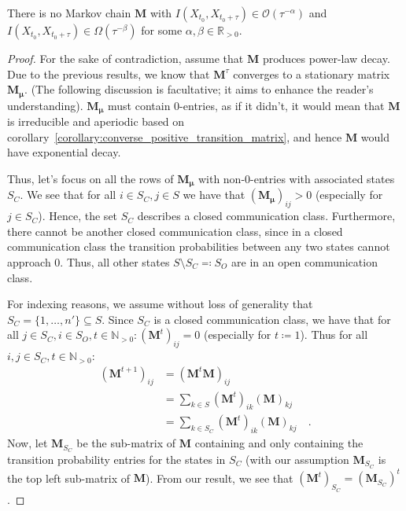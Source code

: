 \documentclass[../../main.tex]{subfiles}
\begin{document}
    \begin{theorem}
        There is no Markov chain $\bm{M}$ with $I(X_{t_0}, X_{t_0 + \tau}) \in \mathcal{O}(\tau^{-\alpha})$ and $I(X_{t_0}, X_{t_0 + \tau}) \in \Omega (\tau^{-\beta})$ for some $\alpha, \beta \in \mathbb{R}_{>0}$.
    \end{theorem}
    \vspace{-2.5em}
    \begin{proof}
        For the sake of contradiction, assume that $\bm{M}$ produces power-law decay. Due to the previous results, we know that $\bm{M}^\tau$ converges to a stationary matrix $\bm{M_\mu}$. (The following discussion is facultative; it aims to enhance the reader's understanding). $\bm{M_\mu}$ must contain 0-entries, as if it didn't, it would mean that $\bm{M}$ is irreducible and aperiodic based on corollary~\ref{corollary:converse_positive_transition_matrix}, and hence $\bm{M}$ would have exponential decay.

        Thus, let's focus on all the rows of $\bm{M_\mu}$ with non-0-entries with associated states $S_C$. We see that for all $i \in S_C, j \in S$ we have that $(\bm{M_\mu})_{ij} > 0$ (especially for $j \in S_C$). Hence, the set $S_C$ describes a closed communication class. Furthermore, there cannot be another closed communication class, since in a closed communication class the transition probabilities between any two states cannot approach 0. Thus, all other states $S \setminus S_C \eqqcolon S_O$ are in an open communication class.
        
        For indexing reasons, we assume without loss of generality that $S_C = \{ 1, \dots, n' \} \subseteq S$.
        Since $S_C$ is a closed communication class, we have that for all $j \in S_C, i \in S_O, t \in \mathbb{N}_{>0}: (\bm{M}^t)_{ij} = 0$ (especially for $t \coloneqq 1$). Thus for all $i,j \in S_C, t \in \mathbb{N}_{>0}$:
        \begin{align*}   
            (\bm{M}^{t+1})_{ij} &= (\bm{M}^t \bm{M})_{ij} \\
            &= \sum_{k \in S} (\bm{M}^t)_{ik} (\bm{M})_{kj} \\
            &= \sum_{k \in S_C} (\bm{M}^t)_{ik} (\bm{M})_{kj} \quad .
        \end{align*}
        Now, let $\bm{M}_{S_C}$ be the sub-matrix of $\bm{M}$ containing and only containing the transition probability entries for the states in $S_C$ (with our assumption $\bm{M}_{S_C}$ is the top left sub-matrix of $\bm{M}$). From our result, we see that $(\bm{M}^t)_{S_C} = (\bm{M}_{S_C})^t$.


\end{proof}
\end{document}
